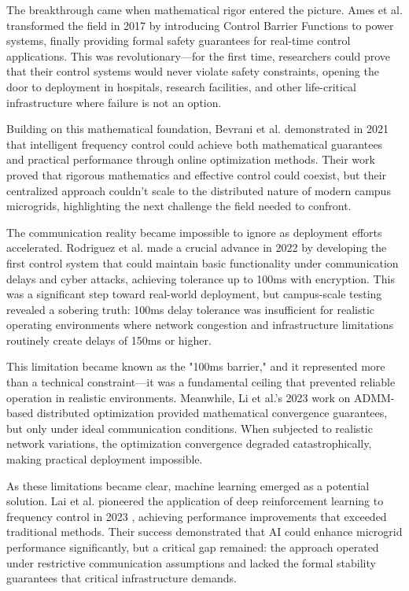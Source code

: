 \documentclass[12pt]{article}
\begin{document}
The breakthrough came when mathematical rigor entered the picture. Ames et al. transformed the field in 2017 \cite{ames2017} by introducing Control Barrier Functions to power systems, finally providing formal safety guarantees for real-time control applications. This was revolutionary—for the first time, researchers could prove that their control systems would never violate safety constraints, opening the door to deployment in hospitals, research facilities, and other life-critical infrastructure where failure is not an option.

Building on this mathematical foundation, Bevrani et al. demonstrated in 2021 \cite{bevrani2021} that intelligent frequency control could achieve both mathematical guarantees and practical performance through online optimization methods. Their work proved that rigorous mathematics and effective control could coexist, but their centralized approach couldn't scale to the distributed nature of modern campus microgrids, highlighting the next challenge the field needed to confront.

The communication reality became impossible to ignore as deployment efforts accelerated. Rodriguez et al. made a crucial advance in 2022 \cite{rodriguez2022} by developing the first control system that could maintain basic functionality under communication delays and cyber attacks, achieving tolerance up to 100ms with encryption. This was a significant step toward real-world deployment, but campus-scale testing revealed a sobering truth: 100ms delay tolerance was insufficient for realistic operating environments where network congestion and infrastructure limitations routinely create delays of 150ms or higher.

This limitation became known as the "100ms barrier," and it represented more than a technical constraint—it was a fundamental ceiling that prevented reliable operation in realistic environments. Meanwhile, Li et al.'s 2023 work on ADMM-based distributed optimization \cite{li2023} provided mathematical convergence guarantees, but only under ideal communication conditions. When subjected to realistic network variations, the optimization convergence degraded catastrophically, making practical deployment impossible.

As these limitations became clear, machine learning emerged as a potential solution. Lai et al. pioneered the application of deep reinforcement learning to frequency control in 2023 \cite{lai2023}, achieving performance improvements that exceeded traditional methods. Their success demonstrated that AI could enhance microgrid performance significantly, but a critical gap remained: the approach operated under restrictive communication assumptions and lacked the formal stability guarantees that critical infrastructure demands.
\end{document}
